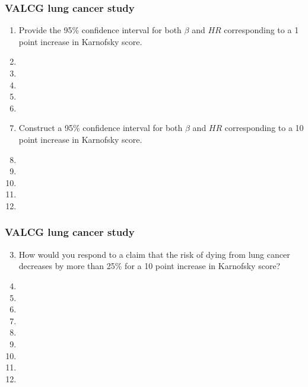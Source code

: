 \begin{frame}
\frametitle{VALCG lung cancer study}
\begin{enumerate}
\item Provide the 95\% confidence interval for both $\beta$ and $HR$ corresponding to a 1 point increase in Karnofsky score.
\item[]
\item[]
\item[]
\item[]
\item[]
\item Construct a 95\% confidence interval for both $\beta$ and $HR$ corresponding to a 10 point increase in Karnofsky score.
\item[]
\item[]
\item[]
\item[]
\item[]
\end{enumerate}
\end{frame}

\begin{frame}
\frametitle{VALCG lung cancer study}
\begin{enumerate}
\setcounter{enumi}{2}
\item How would you respond to a claim that the risk of dying from lung cancer decreases by more than 25\% for a 10 point increase in Karnofsky score?
\item[]
\item[]
\item[]
\item[]
\item[]
\item[]
\item[]
\item[]
\item[]
\end{enumerate}
\end{frame}


